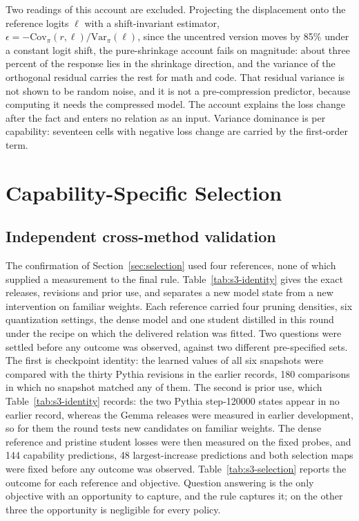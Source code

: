 Two readings of this account are excluded. Projecting the displacement onto the reference logits $\ell$
with a shift-invariant estimator, $\epsilon=-\mathrm{Cov}_{\pi}(r,\ell)/\mathrm{Var}_{\pi}(\ell)$, since the uncentred version moves by 85\% under a constant logit shift, the pure-shrinkage account
fails on magnitude: about three percent of the response lies in the shrinkage direction, and the
variance of the orthogonal residual carries the rest for math and code. That residual variance is
not shown to be random noise, and it is not a pre-compression predictor, because computing it needs
the compressed model. The account explains the loss change after the fact and enters no
relation as an input. Variance dominance is per capability: seventeen cells with negative loss
change are carried by the first-order term.

\section{Capability-Specific Selection}
\label{sec:app_selection}

\subsection{Independent cross-method validation}
\label{sec:app_s3}

The confirmation of Section~\ref{sec:selection} used four references, none of which supplied a
measurement to the final rule. Table~\ref{tab:s3-identity} gives the exact releases, revisions and prior use, and
separates a new model state from a new intervention on familiar weights. Each reference carried
four pruning densities, six quantization settings, the dense model and one student distilled in
this round under the recipe on which the delivered relation was fitted. Two questions were settled
before any outcome was observed, against two different pre-specified sets. The first is checkpoint
identity: the learned values of all six snapshots were compared with the thirty Pythia revisions in
the earlier records, 180 comparisons in which no snapshot matched any of them. The second is
prior use, which Table~\ref{tab:s3-identity} records: the two Pythia step-120000 states
appear in no earlier record, whereas the Gemma releases were measured in earlier development, so
for them the round tests new candidates on familiar weights. The dense reference and pristine
student losses were then measured on the fixed probes, and 144 capability predictions, 48
largest-increase predictions and both selection maps were fixed before any outcome was observed. Table~\ref{tab:s3-selection} reports the outcome for each reference and objective. Question answering is the only objective with an opportunity to capture, and the rule captures it;
on the other three the opportunity is negligible for every policy.



